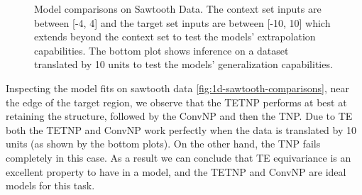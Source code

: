 \documentclass[../../main.tex]{subfiles}
\begin{document}
\begin{figure}[H]
	\centering
	\qquad
	\qquad
	\caption{Model comparisons on Sawtooth Data. The context set inputs are between [-4, 4] and the target set inputs are between [-10, 10] which extends beyond the context set to test the models' extrapolation capabilities. The bottom plot shows inference on a dataset translated by 10 units to test the models' generalization capabilities.}
	\label{fig:1d-sawtooth-comparisons}
\end{figure}

Inspecting the model fits on sawtooth data \autoref{fig:1d-sawtooth-comparisons}, near the edge of the target region, we observe that the TETNP performs at best at retaining the structure, followed by the ConvNP and then the TNP. Due to TE both the TETNP and ConvNP work perfectly when the data is translated by 10 units (as shown by the bottom plots). On the other hand, the TNP fails completely in this case. As a result we can conclude that TE equivariance is an excellent property to have in a model, and the TETNP and ConvNP are ideal models for this task.
\end{document}
